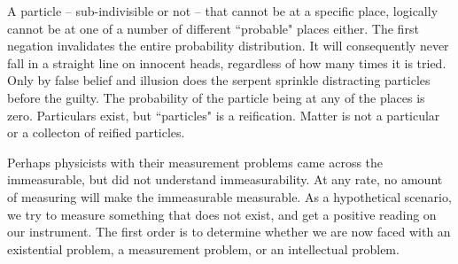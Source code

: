 \begin{footnotesize}
\begin{sffamily}
A particle – sub-indivisible or not – that cannot be at a specific place, logically cannot be at one of a number of different ``probable" places either. The first negation invalidates the entire probability distribution. It will consequently never fall in a straight line on innocent heads, regardless of how many times it is tried. Only by false belief and illusion does the serpent sprinkle distracting particles before the guilty. The probability of the particle being at any of the places is zero. Particulars exist, but ``particles" is a reification. Matter is not a particular or a collecton of reified particles.

Perhaps physicists with their measurement problems came across the immeasurable, but did not understand immeasurability. At any rate, no amount of measuring will make the immeasurable measurable. As a hypothetical scenario, we try to measure something that does not exist, and get a positive reading on our instrument. The first order is to determine whether we are now faced with an existential problem, a measurement problem, or an intellectual problem.


\end{sffamily}\end{footnotesize}
